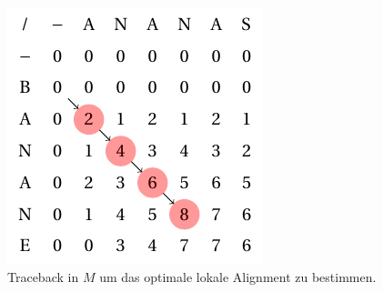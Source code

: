 \begin{figure}[!hb]
  \centering
  \includegraphics[width=.48\linewidth]{./img/sw_matrix/matrix_03.pdf}%
  \caption{Traceback in $M$ um das optimale lokale Alignment zu bestimmen.}
  \label{fig:matrix:trace}%
\end{figure}
